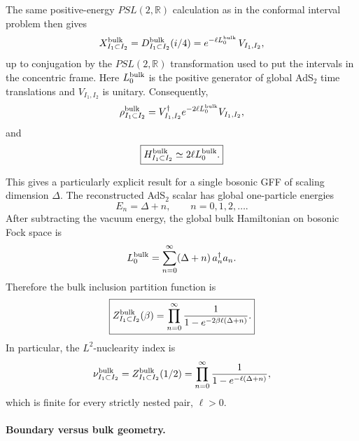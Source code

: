 \documentclass[a4paper,11pt]{article}
\theoremstyle{definition}
\begin{document}
The same positive-energy $PSL(2,\mathbb R)$ calculation as in the
conformal interval problem then gives
\begin{equation}
    X^{\rm bulk}_{I_1\subset I_2}
    =
    D^{\rm bulk}_{I_1\subset I_2}(i/4)
    =
    e^{-\ell L_0^{\rm bulk}}\,V_{I_1,I_2},
    \label{eq:GFF-bulk-X-polar}
\end{equation}
up to conjugation by the $PSL(2,\mathbb R)$ transformation used to put
the intervals in the concentric frame. Here $L_0^{\rm bulk}$ is the
positive generator of global AdS$_2$ time translations and
$V_{I_1,I_2}$ is unitary. Consequently,
\begin{equation}
    \rho^{\rm bulk}_{I_1\subset I_2}
    =
    V_{I_1,I_2}^\dagger
    e^{-2\ell L_0^{\rm bulk}}
    V_{I_1,I_2},
\end{equation}
and
\begin{equation}
    \boxed{
    H^{\rm bulk}_{I_1\subset I_2}
    \simeq
    2\ell L_0^{\rm bulk}.
    }
    \label{eq:GFF-bulk-inclusion-H}
\end{equation}

This gives a particularly explicit result for a single bosonic GFF of
scaling dimension $\Delta$. The reconstructed AdS$_2$ scalar has global
one-particle energies
\begin{equation}
    E_n=\Delta+n,
    \qquad
    n=0,1,2,\ldots .
\end{equation}
After subtracting the vacuum energy, the global bulk Hamiltonian on
bosonic Fock space is
\begin{equation}
    L_0^{\rm bulk}
    =
    \sum_{n=0}^\infty
    (\Delta+n)\,a_n^\dagger a_n.
\end{equation}
Therefore the bulk inclusion partition function is
\begin{equation}
    \boxed{
    Z^{\rm bulk}_{I_1\subset I_2}(\beta)
    =
    \prod_{n=0}^\infty
    \frac{
        1
    }{
        1-e^{-2\beta\ell(\Delta+n)}
    }.
    }
    \label{eq:GFF-bulk-inclusion-partition}
\end{equation}
In particular, the $L^2$-nuclearity index is
\begin{equation}
    \nu^{\rm bulk}_{I_1\subset I_2}
    =
    Z^{\rm bulk}_{I_1\subset I_2}(1/2)
    =
    \prod_{n=0}^\infty
    \frac{
        1
    }{
        1-e^{-\ell(\Delta+n)}
    },
    \label{eq:GFF-bulk-nuclearity}
\end{equation}
which is finite for every strictly nested pair, $\ell>0$.

\paragraph{Boundary versus bulk geometry.}
\end{document}
